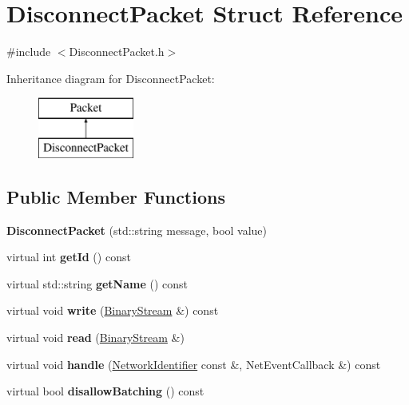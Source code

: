 \hypertarget{struct_disconnect_packet}{}\section{Disconnect\+Packet Struct Reference}
\label{struct_disconnect_packet}


{\ttfamily \#include $<$Disconnect\+Packet.\+h$>$}

Inheritance diagram for Disconnect\+Packet\+:\begin{figure}[H]
\begin{center}
\leavevmode
\includegraphics[height=2.000000cm]{struct_disconnect_packet}
\end{center}
\end{figure}
\subsection*{Public Member Functions}
\begin{DoxyCompactItemize}
\item 
\mbox{\label{struct_disconnect_packet_a48116574196d7ae53c4c9f4f5fef25ad}} 
{\bfseries Disconnect\+Packet} (std\+::string message, bool value)
\item 
\mbox{\label{struct_disconnect_packet_aec0eaff8d5e1e4bf65f9e8e2cffc222a}} 
virtual int {\bfseries get\+Id} () const
\item 
\mbox{\label{struct_disconnect_packet_a3461d85986ae0c4f90573041b0f1b4db}} 
virtual std\+::string {\bfseries get\+Name} () const
\item 
\mbox{\label{struct_disconnect_packet_a4657059057a4a3dde247c7996b3052e1}} 
virtual void {\bfseries write} (\mbox{\hyperlink{struct_binary_stream}{Binary\+Stream}} \&) const
\item 
\mbox{\label{struct_disconnect_packet_a173fa837d131d53b366689f8d67bc4d1}} 
virtual void {\bfseries read} (\mbox{\hyperlink{struct_binary_stream}{Binary\+Stream}} \&)
\item 
\mbox{\label{struct_disconnect_packet_aeef437758c02ca2ab484c47c69c7faaf}} 
virtual void {\bfseries handle} (\mbox{\hyperlink{struct_network_identifier}{Network\+Identifier}} const \&, Net\+Event\+Callback \&) const
\item 
\mbox{\label{struct_disconnect_packet_af96fc4e08367b6a8fbd2bc562f659953}} 
virtual bool {\bfseries disallow\+Batching} () const
\end{DoxyCompactItemize}
